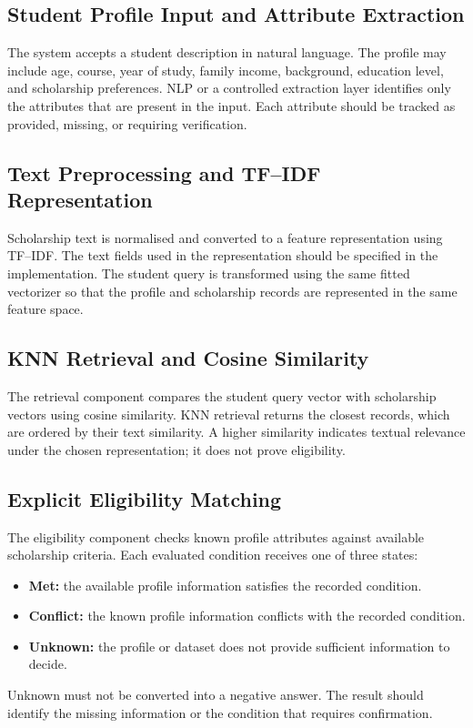 \documentclass[conference]{IEEEtran}
\begin{document}
\subsection{Student Profile Input and Attribute Extraction}
The system accepts a student description in natural language. The profile may include age, course, year of study, family income, background, education level, and scholarship preferences. NLP or a controlled extraction layer identifies only the attributes that are present in the input. Each attribute should be tracked as provided, missing, or requiring verification.

\subsection{Text Preprocessing and TF--IDF Representation}
Scholarship text is normalised and converted to a feature representation using TF--IDF. The text fields used in the representation should be specified in the implementation. The student query is transformed using the same fitted vectorizer so that the profile and scholarship records are represented in the same feature space.

\subsection{KNN Retrieval and Cosine Similarity}
The retrieval component compares the student query vector with scholarship vectors using cosine similarity. KNN retrieval returns the closest records, which are ordered by their text similarity. A higher similarity indicates textual relevance under the chosen representation; it does not prove eligibility.

\subsection{Explicit Eligibility Matching}
The eligibility component checks known profile attributes against available scholarship criteria. Each evaluated condition receives one of three states:
\begin{itemize}
  \item \textbf{Met:} the available profile information satisfies the recorded condition.
  \item \textbf{Conflict:} the known profile information conflicts with the recorded condition.
  \item \textbf{Unknown:} the profile or dataset does not provide sufficient information to decide.
\end{itemize}
Unknown must not be converted into a negative answer. The result should identify the missing information or the condition that requires confirmation.
\end{document}
